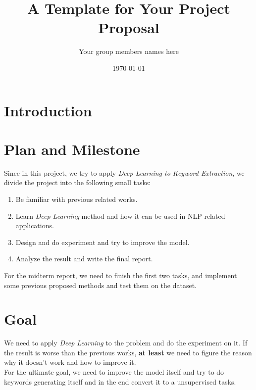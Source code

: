 \documentclass[dvips,12pt]{article}
\begin{document}

\title{A Template for Your Project Proposal}
\author{Your group members names here}
\date{\today}



\maketitle


\section{Introduction}

\section{Plan and Milestone}
Since in this project, we try to apply \emph{Deep Learning to Keyword Extraction}, we divide the project into the following small tasks:
\begin{enumerate}
    \item Be familiar with previous related works.
    \item Learn \emph{Deep Learning} method and how it can be used in NLP related applications.
    \item Design and do experiment and try to improve the model.
    \item Analyze the result and write the final report.
\end{enumerate}
For the midterm report, we need to finish the first two tasks, and implement some previous proposed methods and test them on the dataset.
\section{Goal}
We need to apply \emph{Deep Learning} to the problem and do the experiment on it. If the result is worse than the previous works, \textbf{at least} we need to figure the reason why it doesn't work and how to improve it. \\
For the ultimate goal, we need to improve the model itself and try to do keywords generating itself and in the end convert it to a unsupervised tasks.
\end{document}
